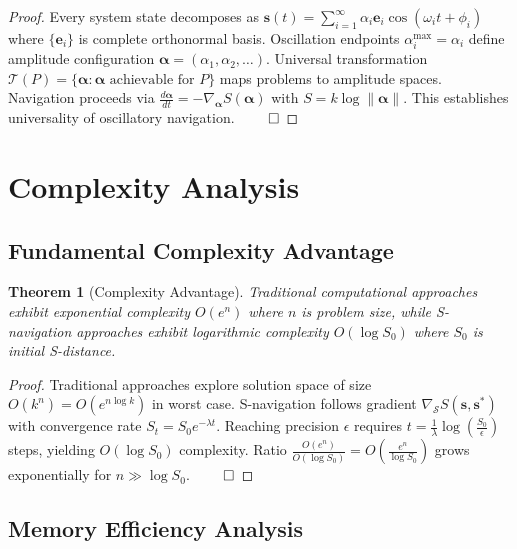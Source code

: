 \documentclass[11pt]{article}
\newtheorem{theorem}{Theorem}[section]
\theoremstyle{definition}
\theoremstyle{remark}
\begin{document}
\begin{proof}
Every system state decomposes as $\mathbf{s}(t) = \sum_{i=1}^{\infty} \alpha_i \mathbf{e}_i \cos(\omega_i t + \phi_i)$ where $\{\mathbf{e}_i\}$ is complete orthonormal basis. Oscillation endpoints $\alpha_i^{\max} = \alpha_i$ define amplitude configuration $\boldsymbol{\alpha} = (\alpha_1, \alpha_2, \ldots)$. Universal transformation $\mathcal{T}(P) = \{\boldsymbol{\alpha} : \boldsymbol{\alpha} \text{ achievable for } P\}$ maps problems to amplitude spaces. Navigation proceeds via $\frac{d\boldsymbol{\alpha}}{dt} = -\nabla_{\boldsymbol{\alpha}} S(\boldsymbol{\alpha})$ with $S = k \log \|\boldsymbol{\alpha}\|$. This establishes universality of oscillatory navigation. $\qed$
\end{proof}

\section{Complexity Analysis}

\subsection{Fundamental Complexity Advantage}

\begin{theorem}[Complexity Advantage]
Traditional computational approaches exhibit exponential complexity $O(e^n)$ where $n$ is problem size, while S-navigation approaches exhibit logarithmic complexity $O(\log S_0)$ where $S_0$ is initial S-distance.
\end{theorem}

\begin{proof}
Traditional approaches explore solution space of size $O(k^n) = O(e^{n \log k})$ in worst case. S-navigation follows gradient $\nabla_{\mathcal{S}} S(\mathbf{s}, \mathbf{s}^*)$ with convergence rate $S_t = S_0 e^{-\lambda t}$. Reaching precision $\epsilon$ requires $t = \frac{1}{\lambda} \log(\frac{S_0}{\epsilon})$ steps, yielding $O(\log S_0)$ complexity. Ratio $\frac{O(e^n)}{O(\log S_0)} = O(\frac{e^n}{\log S_0})$ grows exponentially for $n \gg \log S_0$. $\qed$
\end{proof}

\subsection{Memory Efficiency Analysis}
\end{document}
